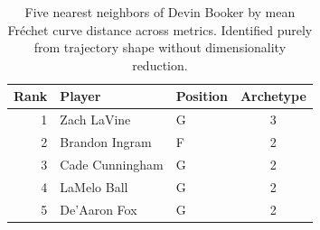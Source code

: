\begin{table}[htbp]
  \centering\small
  \begin{tabular}{rllc}
    \toprule
    Rank & Player & Position & Archetype \\
    \midrule
    1 & Zach LaVine & G & 3 \\
    2 & Brandon Ingram & F & 2 \\
    3 & Cade Cunningham & G & 2 \\
    4 & LaMelo Ball & G & 2 \\
    5 & De'Aaron Fox & G & 2 \\
    \bottomrule
  \end{tabular}
  \caption{Five nearest neighbors of Devin Booker by mean Fr\'{e}chet curve distance across metrics. Identified purely from trajectory shape without dimensionality reduction.}
  \label{tab:Devin_Booker_frechet_curve_neighbors}
\end{table}

